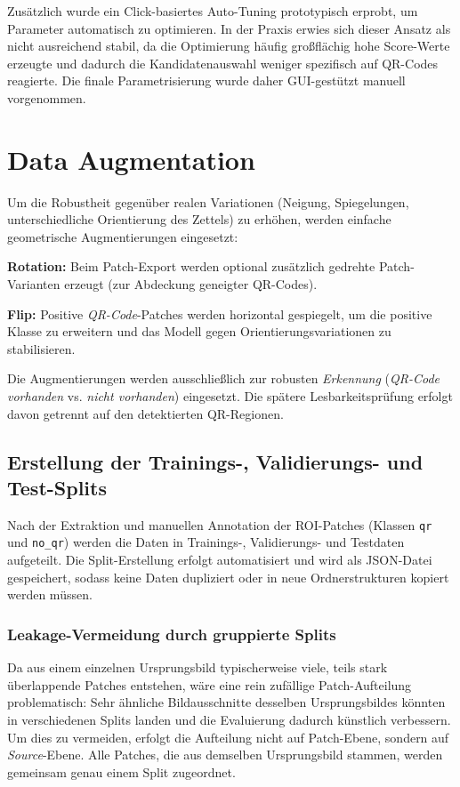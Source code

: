 Zusätzlich wurde ein Click-basiertes Auto-Tuning prototypisch erprobt, um Parameter automatisch zu optimieren. In der Praxis erwies sich dieser Ansatz als nicht ausreichend stabil, da die Optimierung häufig großflächig hohe Score-Werte erzeugte und dadurch die Kandidatenauswahl weniger spezifisch auf \ac{QR}-Codes reagierte. Die finale Parametrisierung wurde daher \ac{GUI}-gestützt manuell vorgenommen.


\section{Data Augmentation}
\label{sec:dataaugmentation}
Um die Robustheit gegenüber realen Variationen (Neigung, Spiegelungen, unterschiedliche Orientierung des Zettels) zu erhöhen, werden einfache geometrische Augmentierungen eingesetzt:

\begin{listNorm}
    \item \textbf{Rotation:} Beim Patch-Export werden optional zusätzlich gedrehte Patch-Varianten erzeugt (zur Abdeckung geneigter \ac{QR}-Codes).
    \item \textbf{Flip:} Positive \emph{QR-Code}-Patches werden horizontal gespiegelt, um die positive Klasse zu erweitern und das Modell gegen Orientierungsvariationen zu stabilisieren.
\end{listNorm}

Die Augmentierungen werden ausschließlich zur robusten \emph{Erkennung} (\emph{QR-Code vorhanden} vs. \emph{nicht vorhanden}) eingesetzt. Die spätere Lesbarkeitsprüfung erfolgt davon getrennt auf den detektierten \ac{QR}-Regionen.

\subsection{Erstellung der Trainings-, Validierungs- und Test-Splits}
\label{subsec:patch_splits}

Nach der Extraktion und manuellen Annotation der \ac{ROI}-Patches (Klassen \texttt{qr} und \texttt{no\_qr}) werden die Daten in Trainings-, Validierungs- und Testdaten aufgeteilt. Die Split-Erstellung erfolgt automatisiert und wird als JSON-Datei gespeichert, sodass keine Daten dupliziert oder in neue Ordnerstrukturen kopiert werden müssen. 

\subsubsection{Leakage-Vermeidung durch gruppierte Splits}
Da aus einem einzelnen Ursprungsbild typischerweise viele, teils stark überlappende Patches entstehen, wäre eine rein zufällige Patch-Aufteilung problematisch: Sehr ähnliche Bildausschnitte desselben Ursprungsbildes könnten in verschiedenen Splits landen und die Evaluierung dadurch künstlich verbessern.  
Um dies zu vermeiden, erfolgt die Aufteilung nicht auf Patch-Ebene, sondern auf \emph{Source}-Ebene. Alle Patches, die aus demselben Ursprungsbild stammen, werden gemeinsam genau einem Split zugeordnet.

